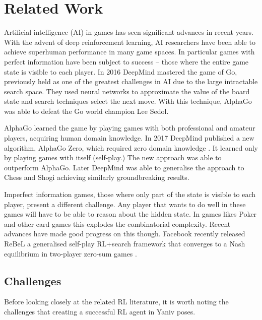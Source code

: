 \documentclass[../main.tex]{subfiles}
\begin{document}
\chapter{Related Work}
\label{cha:RelatedWork}

Artificial intelligence (AI) in games has seen significant advances in recent years. With the advent of deep reinforcement learning, AI researchers have been able to achieve superhuman performance in many game spaces. In particular games with perfect information have been subject to success -- those where the entire game state is visible to each player. In 2016 DeepMind \cite{silver_mastering_2016} mastered the game of Go, previously held as one of the greatest challenges in AI due to the large intractable search space. They used neural networks to approximate the value of the board state and search techniques select the next move. With this technique, AlphaGo was able to defeat the Go world champion Lee Sedol. 

AlphaGo learned the game by playing games with both professional and amateur players, acquiring human domain knowledge. In 2017 DeepMind published a new algorithm, AlphaGo Zero, which required zero domain knowledge \cite{silver_mastering_2017}. It learned only by playing games with itself (self-play.) The new approach was able to outperform AlphaGo. Later DeepMind \cite{silver_mastering_2017-1} was able to generalise the approach to Chess and Shogi achieving similarly groundbreaking results. 

Imperfect information games, those where only part of the state is visible to each player, present a different challenge. Any player that wants to do well in these games will have to be able to reason about the hidden state. In games likes Poker and other card games this explodes the combinatorial complexity. Recent advances have made good progress on this though. Facebook recently released ReBeL a generalised self-play RL+search framework that converges to a Nash equilibrium in two-player zero-sum games \cite{brown_combining_2020}. 


\section{Challenges} \label{challenges}
Before looking closely at the related RL literature, it is worth noting the challenges that creating a successful RL agent in Yaniv poses. 
\end{document}

